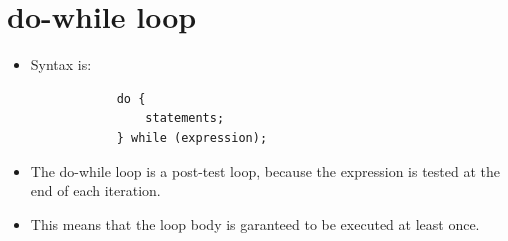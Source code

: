 \section{do-while loop}
\begin{itemize}
    \item Syntax is: 
        \begin{verbatim}
            do {
                statements;
            } while (expression);
        \end{verbatim}
    \item The do-while loop is a post-test loop, because the expression is tested at the end of each iteration.
    \item This means that the loop body is garanteed to be executed at least once.
\end{itemize}

